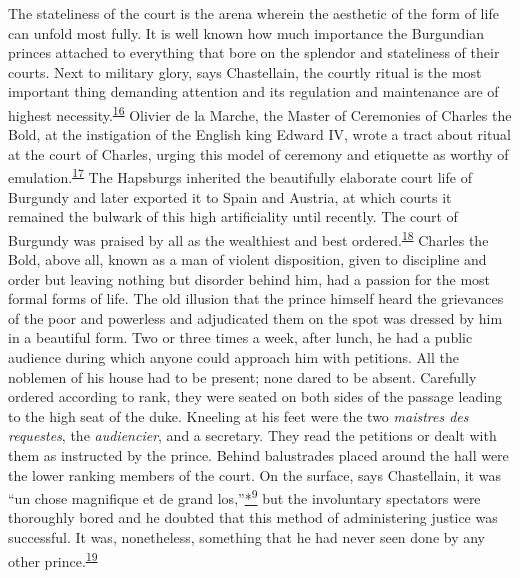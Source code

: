 The stateliness of the court is the arena wherein the aesthetic of the
form of life can unfold most fully. It is well known how much importance
the Burgundian princes attached to everything that bore on the splendor
and stateliness of their courts. Next to military glory, says
Chastellain, the courtly ritual is the most important thing demanding
attention and its regulation and maintenance are of highest
necessity.\textsuperscript{\protect\hypertarget{09_Chapter_Two__THE_CRAVING_FOR_A_M.xhtmlux5cux23id_2055}{\protect\hyperlink{23_NOTES.xhtmlux5cux23id_2056}{16}}}
Olivier de la Marche, the Master of Ceremonies of Charles the Bold, at
the instigation of the English king Edward IV, wrote a tract about
ritual at the court of Charles, urging this model of ceremony and
etiquette as worthy of
emulation.\textsuperscript{\protect\hypertarget{09_Chapter_Two__THE_CRAVING_FOR_A_M.xhtmlux5cux23id_2053}{\protect\hyperlink{23_NOTES.xhtmlux5cux23id_2054}{17}}}
The Hapsburgs inherited the beautifully elaborate court life of Burgundy
and later exported it to Spain and Austria, at which courts it remained
the bulwark of this high artificiality until recently. The court of
Burgundy was praised by all as the wealthiest and best
ordered.\textsuperscript{\protect\hypertarget{09_Chapter_Two__THE_CRAVING_FOR_A_M.xhtmlux5cux23id_2051}{\protect\hyperlink{23_NOTES.xhtmlux5cux23id_2052}{18}}}
Charles the Bold, above all, known as a man of violent disposition,
given to discipline and order but leaving nothing but disorder behind
him, had a passion for the most formal forms of life. The old illusion
that the prince himself heard the grievances of the poor and powerless
and adjudicated them on the spot was dressed by him in a beautiful form.
Two or three times
\protect\hypertarget{09_Chapter_Two__THE_CRAVING_FOR_A_M.xhtmlux5cux23page_43}{}{}a
week, after lunch, he had a public audience during which anyone could
approach him with petitions. All the noblemen of his house had to be
present; none dared to be absent. Carefully ordered according to rank,
they were seated on both sides of the passage leading to the high seat
of the duke. Kneeling at his feet were the two \emph{maistres des
requestes}, the \emph{audiencier}, and a secretary. They read the
petitions or dealt with them as instructed by the prince. Behind
balustrades placed around the hall were the lower ranking members of the
court. On the surface, says Chastellain, it was ``un chose magnifique et
de grand
los,''\protect\hypertarget{09_Chapter_Two__THE_CRAVING_FOR_A_M.xhtmlux5cux23id_2427}{\protect\hyperlink{23_NOTES.xhtmlux5cux23id_2428}{*\textsuperscript{9}}}
but the involuntary spectators were thoroughly bored and he doubted that
this method of administering justice was successful. It was,
nonetheless, something that he had never seen done by any other
prince.\textsuperscript{\protect\hypertarget{09_Chapter_Two__THE_CRAVING_FOR_A_M.xhtmlux5cux23id_2049}{\protect\hyperlink{23_NOTES.xhtmlux5cux23id_2050}{19}}}

